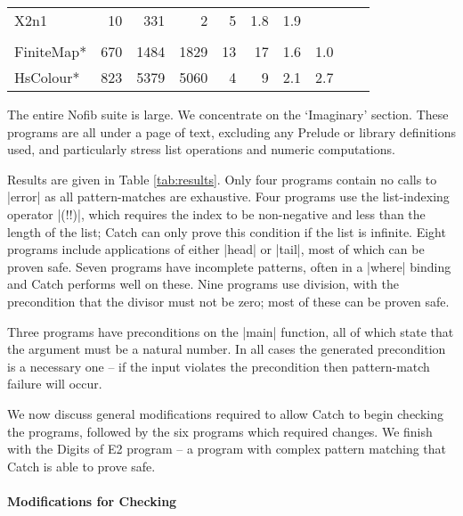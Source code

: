 \documentclass[preprint]{sigplanconf}
\begin{document}
\begin{table}
\begin{tabular*}{\linewidth}{lrrrrrrlll}
\hspace{-2mm} X2n1                         & 10 &  331 & 2 &  5 & 1.8 & 1.9 \\
\vspace{-1ex} \\
\hspace{-2mm} FiniteMap*    \hspace{-3mm} & 670 & 1484 & 1829 & 13 & 17 & 1.6 & 1.0 \\
\hspace{-2mm} HsColour*     \hspace{-3mm} & 823 & 5379 & 5060 & 4 &  9 & 2.1 & 2.7 \\
\hline
\end{tabular*}
\end{table}

The entire Nofib suite \cite{nofib} is large. We concentrate on the `Imaginary' section. These programs are all under a page of text, excluding any Prelude or library definitions used, and particularly stress list operations and numeric computations.

Results are given in Table \ref{tab:results}. Only four programs contain no calls to |error| as all pattern-matches are exhaustive. Four programs use the list-indexing operator |(!!)|, which requires the index to be non-negative and less than the length of the list; Catch can only prove this condition if the list is infinite. Eight programs include applications of either |head| or |tail|, most of which can be proven safe. Seven programs have incomplete patterns, often in a |where| binding and Catch performs well on these. Nine programs use division, with the precondition that the divisor must not be zero; most of these can be proven safe.

Three programs have preconditions on the |main| function, all of which state that the argument must be a natural number. In all cases the generated precondition is a necessary one -- if the input violates the precondition then pattern-match failure will occur.

We now discuss general modifications required to allow Catch to begin checking the programs, followed by the six programs which required changes. We finish with the Digits of E2 program -- a program with complex pattern matching that Catch is able to prove safe.

\paragraph{Modifications for Checking}
\end{document}
